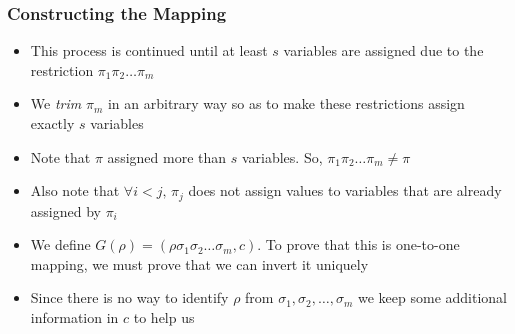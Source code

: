\documentclass{beamer}[11pt]
\begin{document}
\begin{frame}
\frametitle{Constructing the Mapping}
 \begin{itemize}
  \item This process is continued until at least $s$ variables are assigned due to the restriction $\pi_1\pi_2\ldots\pi_m$
  \item We \emph{trim} $\pi_m$ in an arbitrary way so as to make these restrictions assign exactly $s$ variables
  \item Note that $\pi$ assigned more than $s$ variables. So, $\pi_1\pi_2\ldots\pi_m \neq \pi$
  \pause\item Also note that $\forall i<j,\, \pi_j$ does not assign values to variables that are already assigned by $\pi_i$
  \item We define $G(\rho)=(\rho\sigma_1\sigma_2\ldots\sigma_m,c) $. To prove that this is one-to-one mapping, we must prove that we can invert it uniquely
  \item Since there is no way to identify $\rho$ from $\sigma_1,\sigma_2,\ldots,\sigma_m$ we keep some additional information in $c$ to help us
  
 \end{itemize}

\end{frame}
\end{document}
